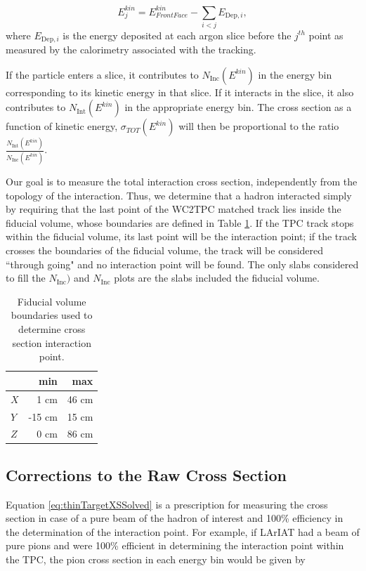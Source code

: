 \begin{equation}
 E_{j}^{kin} =  E^{kin}_{Front Face} - \sum_{i < j} E_{\text{Dep},i},
\label{eq:KEj}
\end{equation}
where $E_{\text{Dep},i}$ is the energy deposited at each argon slice before the $j^{th}$ point as measured by the calorimetry associated with the tracking.


If the particle enters a slice, it contributes to $N_{\text{Inc}}( E^{kin})$ in the energy bin corresponding to its kinetic energy in that slice. If it interacts in the slice, it also contributes to $N_{\text{Int}}(E^{kin})$ in the appropriate energy bin. The cross section as a function of kinetic energy, $\sigma_{TOT}( E^{kin})$ will then be proportional to the ratio $\frac{N_{\text{Int}}( E^{kin})}{N_{\text{Inc}}( E^{kin})}$. 


Our goal is to measure the total interaction cross section, independently  from the topology of the interaction. Thus, we determine that a hadron interacted simply by requiring that the last point of the WC2TPC matched track lies inside the fiducial volume, whose boundaries are defined in Table \ref{tab:FidVol}. If the TPC track stops within the fiducial volume, its last point will be the interaction point; if the track crosses the boundaries of the fiducial volume, the track will be considered ``through going" and no interaction point will be found. The only slabs considered to fill the  $N_{\text{Inc}})$ and  $N_{\text{Inc}}$ plots are the slabs included the fiducial volume.



\begin{table}[t]
\centering
\begin{tabular}{|l|r|r|}
\hline
& min   &  max  \\ \hline
$X$ & 1 cm   & 46 cm  \\ \hline
$Y$ & -15 cm   & 15  cm  \\ \hline
$Z$ & 0 cm   & 86 cm  \\ \hline
\end{tabular}
\caption{Fiducial volume boundaries used to determine cross section interaction point. }
\label{tab:FidVol}
\end{table}



\subsection{Corrections to the Raw Cross Section}\label{ch:MCCorrections}
Equation \ref{eq:thinTargetXSSolved}  is a prescription for measuring the cross section in case of a pure beam of the hadron of interest and 100\% efficiency in the determination of the interaction point.  For example, if LArIAT had a beam of pure pions and were 100\% efficient in determining the interaction point within the TPC, the pion cross section in each energy bin would be given by

